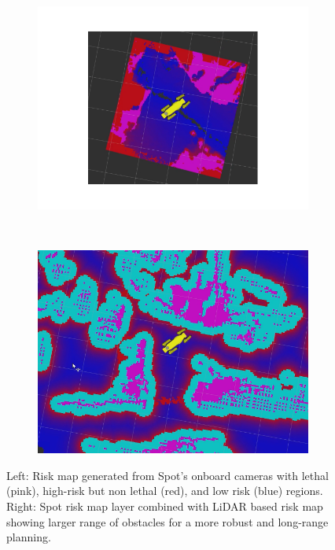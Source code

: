 \documentclass[letterpaper, 10 pt, conference]{ieeeconf}  %
\begin{document}
\begin{figure}[thpb]
   \centering
    \begin{subfigure}{0.5\linewidth}
        \centering
        \includegraphics[trim={4cm 3cm 4cm 3.5cm},clip, width=\linewidth]{figs/costmap_bd2.png}
    \end{subfigure}%
    ~
    \begin{subfigure}{0.5\linewidth}
        \centering
        \includegraphics[trim={1cm 1cm 1cm 1cm},clip, width=\linewidth]{figs/costmap_bd2_embedded.png}
    \end{subfigure}
    \caption{Left:  Risk map generated from Spot's onboard cameras with lethal (pink), high-risk but non lethal (red), and low risk (blue) regions. Right: Spot risk map layer combined with LiDAR based risk map showing larger range of obstacles for a more robust and long-range planning.}
    \label{bd_costmap}
\end{figure}
\end{document}
